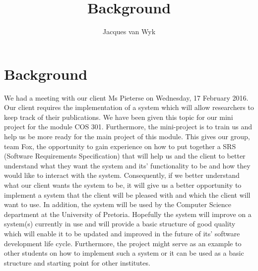 \documentclass[10pt,a4paper]{article}
\author{Jacques van Wyk}
\title{Background}
\begin{document}
	\section{Background}
	
	We had a meeting with our client Ms Pieterse on Wednesday, 17 February 2016.
 	Our client requires the implementation of a system which will allow researchers to keep
 	track of their publications.
 	\newline
 	\newline
 	We have been given this topic for our mini project for the module COS 301. Furthermore, the 	mini-project is to train us and help us be more ready for the main project of this module.
 	\newline
 	\newline
 	This gives our group, team Fox, the opportunity to gain experience on how to put together
    a SRS (Software Requirements Specification) that will help us and the client to better
    understand what they want the system and its' functionality to be and how they 
    would like to interact with the system. Consequently, if we better understand what our
    client wants the system to be, it will give us a better opportunity to implement a system
    that the client will be pleased with and which the client will want to use.
 	\newline
 	\newline
 	In addition, the system will be used by the Computer Science department at the University
 	of Pretoria. Hopefully the system will improve on a system(s) currently in use and will
 	provide a basic structure of good quality which will enable it to be updated and improved
 	in the future of its' software development life cycle.
 	\newline
 	\newline
 	Furthermore, the project might serve as an example to other students on how to implement
 	such a system or it can be used as a basic structure and starting point for other
 	institutes.
 	
\end{document}
